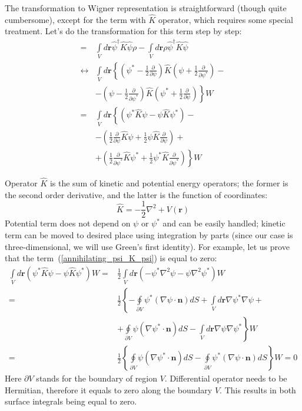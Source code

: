 \documentclass[12pt,notitlepage]{report}
\begin{document}
The transformation to Wigner representation is straightforward (though quite cumbersome),
except for the term with $\hat{K}$ operator, which requires some special treatment.
Let's do the transformation for this term step by step:
\begin{align}
[ \int\limits_V \hat{\psi}^\dagger \hat{K} \hat{\psi}, \rho ]
= & \int\limits_V d\mathbf{r} \hat{\psi}^\dagger \hat{K} \hat{\psi} \rho - \int\limits_V d\mathbf{r} \rho \hat{\psi}^\dagger \hat{K} \hat{\psi} \nonumber \\
\leftrightarrow & \int\limits_V d\mathbf{r} \left\{ \left( \psi^* - \frac{1}{2}\frac{\partial}{\partial\psi}\right) \hat{K} \left( \psi + \frac{1}{2}\frac{\partial}{\partial\psi^*} \right) - \nonumber \right. \\
& \left. - \left( \psi - \frac{1}{2}\frac{\partial}{\partial\psi^*}\right) \hat{K} \left( \psi^* + \frac{1}{2}\frac{\partial}{\partial\psi}  \right) \right\} W \nonumber \\
= & \int\limits_V d\mathbf{r} \left\{ \left( \psi^* \hat{K} \psi - \psi \hat{K} \psi^* \right) -  \right. \label{annihilating_psi_K_psi} \\
& \left. - \left( \frac{1}{2}\frac{\partial}{\partial\psi} \hat{K} \psi +
\frac{1}{2} \psi \hat{K} \frac{\partial}{\partial\psi} \right) \right. + \label{dpsi_K_psi_term} \\
& \left. + \left( \frac{1}{2}\frac{\partial}{\partial\psi^*} \hat{K} \psi^* +
\frac{1}{2} \psi^* \hat{K} \frac{\partial}{\partial\psi^*} \right) \right\} W \label{dpsi_star_K_psi_star_term}
\end{align}

Operator $\hat{K}$ is the sum of kinetic and potential energy operators;
the former is the second order derivative, and the latter is the function of coordinates:
\[ \hat{K} = - \frac{1}{2} \nabla^2 + V(\mathbf{r}) \]
Potential term does not depend on $\psi$ or $\psi^*$ and can be easily handled;
kinetic term can be moved to desired place using integration by parts
(since our case is three-dimensional, we will use Green's first identity).
For example, let us prove that the term~(\ref{annihilating_psi_K_psi}) is equal to zero:
\begin{align*}
\int\limits_V d\mathbf{r} \left( \psi^* \hat{K} \psi - \psi \hat{K} \psi^* \right) W
= {} & \frac{1}{2} \int\limits_V d\mathbf{r} \left( - \psi^* \nabla^2 \psi - \psi \nabla^2 \psi^* \right) W \\
= {} & \frac{1}{2} \left\{ - \oint\limits_{\partial V} \psi^* (\nabla \psi \cdot \mathbf{n}) dS +
\int\limits_V d\mathbf{r} \nabla \psi^* \nabla \psi \right. + \\
& \left. + \oint\limits_{\partial V} \psi (\nabla \psi^* \cdot \mathbf{n}) dS -
\int\limits_V d\mathbf{r} \nabla \psi \nabla \psi^* \right\} W \\
= {} & \frac{1}{2} \left\{ \oint\limits_{\partial V} \psi (\nabla \psi^* \cdot \mathbf{n}) dS -
\oint\limits_{\partial V} \psi^* (\nabla \psi \cdot \mathbf{n}) dS \right\} W = 0
\end{align*}
Here $\partial V$ stands for the boundary of region $V$.
Differential operator needs to be Hermitian, therefore it equals to zero along the boundary $V$.
This results in both surface integrals being equal to zero. 
\end{document}
